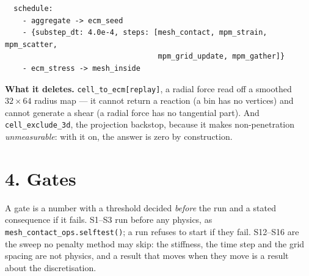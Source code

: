 \documentclass[10pt,a4paper]{article}
\newcommand{\code}[1]{\texttt{#1}}
\newcommand{\op}[1]{\texttt{#1}}
\begin{document}
\smallskip
{\footnotesize
\begin{verbatim}
  schedule:
    - aggregate -> ecm_seed
    - {substep_dt: 4.0e-4, steps: [mesh_contact, mpm_strain, mpm_scatter,
                                   mpm_grid_update, mpm_gather]}
    - ecm_stress -> mesh_inside
\end{verbatim}}
\smallskip

\textbf{What it deletes.} \op{cell\_to\_ecm[replay]}, a radial force read off a smoothed $32\times64$
radius map --- it cannot return a reaction (a bin has no vertices) and cannot generate a shear (a
radial force has no tangential part). And \op{cell\_exclude\_3d}, the projection backstop, because it
makes non-penetration \emph{unmeasurable}: with it on, the answer is zero by construction.

\section*{4.\; Gates}

A gate is a number with a threshold decided \emph{before} the run and a stated consequence if it
fails. S1--S3 run before any physics, as \code{mesh\_contact\_ops.selftest()}; a run refuses to start
if they fail. S12--S16 are the sweep no penalty method may skip: the stiffness, the time step and the
grid spacing are not physics, and a result that moves when they move is a result about the
discretisation.
\end{document}
